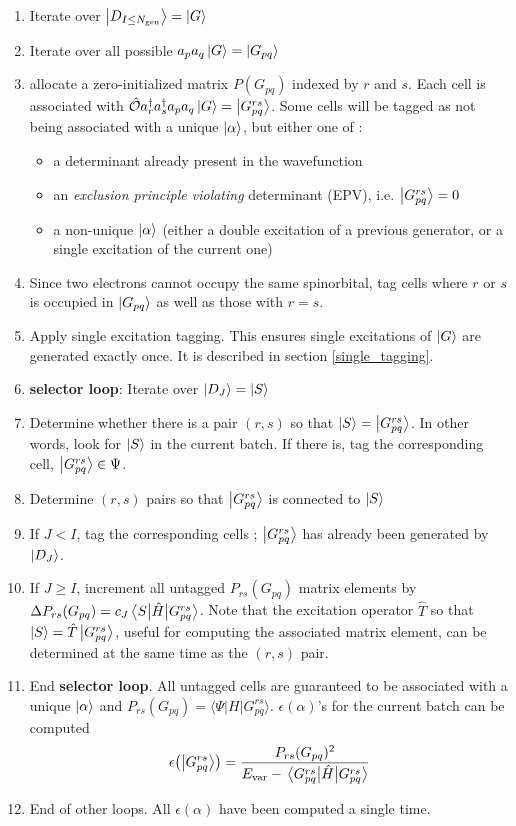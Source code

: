 \documentclass[./thesis.tex]{subfiles}
\begin{document}
\begin{enumerate}
\item
Iterate over $\ket {D_{I \leq {N_\text{gen}}}} = \ket G$
\item
Iterate over all possible $a_p a_q \ket G = \ket {G_{pq}}$
\item
allocate a zero-initialized matrix $P(G_{pq})$ indexed by $r$ and $s$. Each cell is associated with ${\hat{\mathcal{O}}} a^\dagger_r a^\dagger_s a_p a_q  \ket G = \ket{G^{rs}_{pq}}$. Some cells will be tagged as not being associated with a unique $\ket \alpha$, but either one of :
\begin{itemize}
\item
a determinant already present in the wavefunction
\item
an \emph{exclusion principle violating} determinant (EPV), i.e. $\ket{G^{rs}_{pq}} = 0$
\item
a non-unique $\ket \alpha$ (either a double excitation of a previous generator, or a single excitation of the current one)
\end{itemize}

\item
Since two electrons cannot occupy the same spinorbital, tag cells where $r$ or $s$ is occupied in $\ket {G_{pq}}$ as well as those with $r=s$.
\item
Apply single excitation tagging. This ensures single excitations of $\ket G$ are generated exactly once. It is described in section \ref{single_tagging}.
\item
\textbf{selector loop}: Iterate over $\ket {D_J} = \ket S$ 
\item
Determine whether there is a pair $(r,s)$ so that $\ket S = \ket {G_{pq}^{rs}}$. In other words, look for $\ket S$ in the current batch. If there is, tag the corresponding cell, $\ket{G^{rs}_{pq}} \in \Psi$.
\item
Determine $(r,s)$ pairs so that $\ket {G_{pq}^{rs}}$ is connected to $\ket S$
\item
If $J<I$, tag the corresponding cells ; $\ket{G^{rs}_{pq}}$ has already been generated by $\ket {D_J}$.
\item
If $J \geq I$, increment all untagged $P_{rs}(G_{pq})$ matrix elements by $\Delta P_{rs}(G_{pq}) = c_J \mel{S}{\hat{H}}{G^{rs}_{pq}}$. Note that the excitation operator $\hat{T}$ so that $\ket S=\hat{T} \ket{G^{rs}_{pq}}$, useful for computing the associated matrix element, can be determined at the same time as the $(r,s)$ pair.
\item
End \textbf{selector loop}. All untagged cells are guaranteed to be associated with a unique $\ket \alpha$ and $P_{rs}(G_{pq}) = \langle \Psi |H|G^{rs}_{pq} \rangle$. $\epsilon(\alpha)$'s for the current batch can be computed  \\

\begin{equation}
\epsilon \qty(\ket {G_{pq}^{rs}}) = \frac{P_{rs}(G_{pq})^2}{E_\text{var}-\mel{G_{pq}^{rs}}{\hat{H}}{G_{pq}^{rs}}}
\end{equation}
\item
End of other loops. All $\epsilon(\alpha)$ have been computed a single time.

\end{enumerate}
\end{document}
